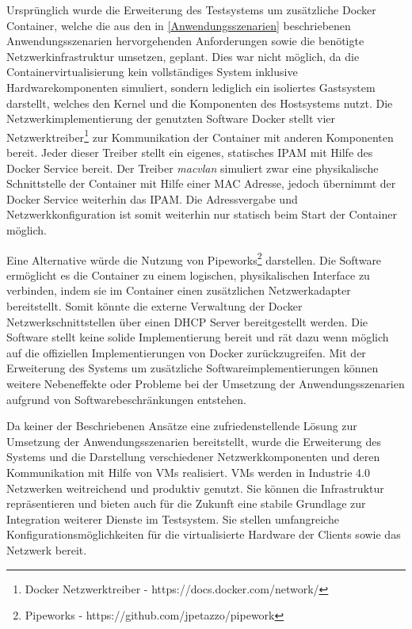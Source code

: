 Ursprünglich wurde die Erweiterung des Testsystems um zusätzliche Docker Container, welche die aus den in \autoref{Anwendungsszenarien} beschriebenen Anwendungsszenarien hervorgehenden Anforderungen sowie die benötigte Netzwerkinfrastruktur umsetzen, geplant. Dies war nicht möglich, da die Containervirtualisierung kein vollständiges System inklusive Hardwarekomponenten simuliert, sondern lediglich ein isoliertes Gastsystem darstellt, welches den Kernel und die Komponenten des Hostsystems nutzt. Die Netzwerkimplementierung der genutzten Software Docker stellt vier Netzwerktreiber\footnote{Docker Netzwerktreiber - https://docs.docker.com/network/} zur Kommunikation der Container mit anderen Komponenten bereit. Jeder dieser Treiber stellt ein eigenes, statisches \ac{IPAM} mit Hilfe des Docker Service bereit. Der Treiber \textit{macvlan} simuliert zwar eine physikalische Schnittstelle der Container mit Hilfe einer \ac{MAC} Adresse, jedoch übernimmt der Docker Service weiterhin das \ac{IPAM}. Die Adressvergabe und Netzwerkkonfiguration ist somit weiterhin nur statisch beim Start der Container möglich. 

Eine Alternative würde die Nutzung von Pipeworks\footnote{Pipeworks - https://github.com/jpetazzo/pipework} darstellen. Die Software ermöglicht es die Container zu einem logischen, physikalischen Interface zu verbinden, indem sie im Container einen zusätzlichen Netzwerkadapter bereitstellt. Somit könnte die externe Verwaltung der Docker Netzwerkschnittstellen über einen \ac{DHCP} Server bereitgestellt werden. Die Software stellt keine solide Implementierung bereit und rät dazu wenn möglich auf die offiziellen Implementierungen von Docker zurückzugreifen. Mit der Erweiterung des Systems um zusätzliche Softwareimplementierungen können weitere Nebeneffekte oder Probleme bei der Umsetzung der Anwendungsszenarien aufgrund von Softwarebeschränkungen entstehen.

Da keiner der Beschriebenen Ansätze eine zufriedenstellende Lösung zur Umsetzung der Anwendungsszenarien bereitstellt, wurde die Erweiterung des Systems und die Darstellung verschiedener Netzwerkkomponenten und deren Kommunikation mit Hilfe von \ac{VM}s realisiert. \ac{VM}s werden in Industrie 4.0 Netzwerken weitreichend und produktiv genutzt. Sie können die Infrastruktur repräsentieren und bieten auch für die Zukunft eine stabile Grundlage zur Integration weiterer Dienste im Testsystem. Sie stellen umfangreiche Konfigurationsmöglichkeiten für die virtualisierte Hardware der Clients sowie das Netzwerk bereit.